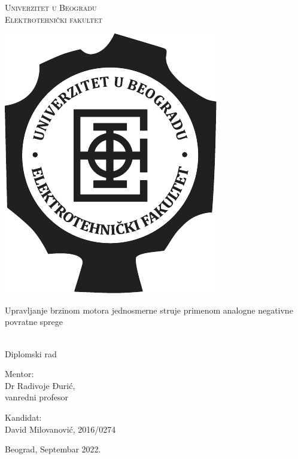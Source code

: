 \documentclass[a4paper, 12pt, diplomski]{etf}
\begin{document}


\begin{center}
    {
    \Large
    \textsc{Univerzitet u Beogradu} \\
    \textsc{Elektrotehnički fakultet} \\
	
	\vspace{22pt}    
    
    \includegraphics[scale=.5]{fig/etf_logo_korice.pdf}
    
    \vspace{3.5cm}
    
    \vfill
    
    \LARGE
    Upravljanje brzinom motora jednosmerne struje primenom analogne negativne povratne sprege
    } \\[2mm]
    {\large Diplomski rad}
    
	\vspace{3.5cm}    
    
    \vfill
    
    \large 
    
    \begin{minipage}[t]{.49\textwidth}
    \begin{flushleft}    
    Mentor:     \\
    Dr Radivoje Đurić, \\
    vanredni profesor
    \end{flushleft}
    \end{minipage}
    \begin{minipage}[t]{.49\textwidth}
    \begin{flushright}
    Kandidat: \\
    David Milovanović, 2016/0274
    \end{flushright}
    \end{minipage}

    
    \vfill   
    
    Beograd, Septembar 2022.
\end{center}

\thispagestyle{empty}
\end{document}
